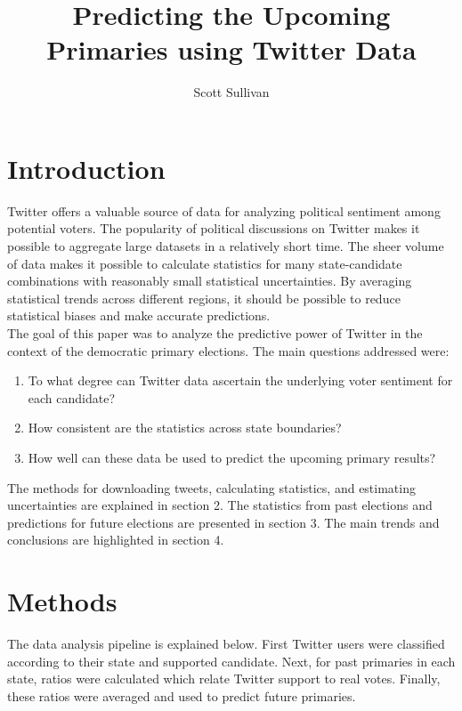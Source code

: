 \documentclass[12pt]{extarticle}
\title{
{\LARGE \bfseries Predicting the Upcoming Primaries using Twitter Data}
}
\author{Scott Sullivan}
\begin{document}
\maketitle

\newpage

\section{Introduction}
Twitter offers a valuable source of data for analyzing political sentiment among potential voters.
The popularity of political discussions on Twitter makes it possible to aggregate large datasets in a relatively short time.
The sheer volume of data makes it possible to calculate statistics for many state-candidate combinations with reasonably small statistical uncertainties.
By averaging statistical trends across different regions, it should be possible to reduce statistical biases and make accurate predictions.
\\
\indent
The goal of this paper was to analyze the predictive power of Twitter in the context of the democratic primary elections.
The main questions addressed were:
\begin{enumerate}
\item To what degree can Twitter data ascertain the underlying voter sentiment for each candidate?
\item How consistent are the statistics across state boundaries?
\item How well can these data be used to predict the upcoming primary results?
\end{enumerate}
The methods for downloading tweets, calculating statistics, and estimating uncertainties are explained in section 2.
The statistics from past elections and predictions for future elections are presented in section 3.
The main trends and conclusions are highlighted in section 4.

\section{Methods}
The data analysis pipeline is explained below.
First Twitter users were classified according to their state and supported candidate.
Next, for past primaries in each state, ratios were calculated which relate Twitter support to real votes.
Finally, these ratios were averaged and used to predict future primaries.
\end{document}
